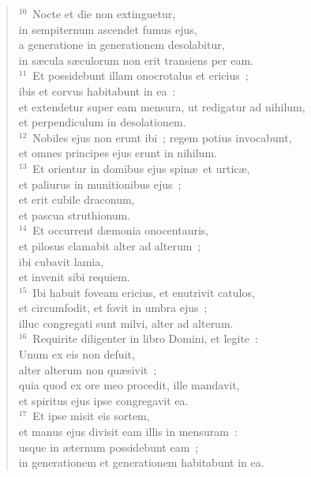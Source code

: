 \begin{verse}
${}^{10}$~Nocte et die non extinguetur,\\ in sempiternum ascendet fumus ejus,\\ a generatione in generationem desolabitur,\\ in s\ae cula s\ae culorum non erit transiens per eam.\\
${}^{11}$~Et possidebunt illam onocrotalus et ericius~;\\ ibis et corvus habitabunt in ea~:\\ et extendetur super eam mensura, ut redigatur ad nihilum,\\ et perpendiculum in desolationem.\\
${}^{12}$~Nobiles ejus non erunt ibi~; regem potius invocabunt,\\ et omnes principes ejus erunt in nihilum.\\
${}^{13}$~Et orientur in domibus ejus spin\ae\ et urtic\ae ,\\ et paliurus in munitionibus ejus~;\\ et erit cubile draconum,\\ et pascua struthionum.\\
${}^{14}$~Et occurrent d\ae monia onocentauris,\\ et pilosus clamabit alter ad alterum~;\\ ibi cubavit lamia,\\ et invenit sibi requiem.\\
${}^{15}$~Ibi habuit foveam ericius, et enutrivit catulos,\\ et circumfodit, et fovit in umbra ejus~;\\ illuc congregati sunt milvi, alter ad alterum.\\
${}^{16}$~Requirite diligenter in libro Domini, et legite~:\\ Unum ex eis non defuit,\\ alter alterum non qu\ae sivit~;\\ quia quod ex ore meo procedit, ille mandavit,\\ et spiritus ejus ipse congregavit ea.\\
${}^{17}$~Et ipse misit eis sortem,\\ et manus ejus divisit eam illis in mensuram~:\\ usque in \ae ternum possidebunt eam~;\\ in generationem et generationem habitabunt in ea.\end{verse}


